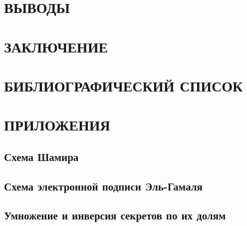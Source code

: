 \documentclass[a4paper,12pt]{article}
\begin{document}
	\section*{ВЫВОДЫ}
	
	\section*{ЗАКЛЮЧЕНИЕ}
	
	\section*{БИБЛИОГРАФИЧЕСКИЙ СПИСОК}
	
	\section*{ПРИЛОЖЕНИЯ}
	
	\renewcommand\thesubsection{\arabic{subsection}}
	
		\subsection{Схема Шамира}
		\subsection{Схема электронной подписи Эль-Гамаля}
		\subsection{Умножение и инверсия секретов по их долям}
	
	
\end{document}
